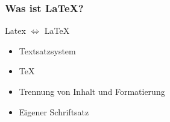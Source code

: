 \begin{frame}
    \frametitle{Was ist \LaTeX?}
    \begin{block}{Latex $\Leftrightarrow$ \LaTeX}
        \begin{itemize}
            \item Textsatzsystem
            \item \TeX
            \item Trennung von Inhalt und Formatierung
            \item Eigener Schriftsatz
        \end{itemize}
    \end{block}
\end{frame}
